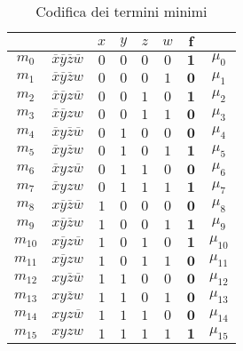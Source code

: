 \documentclass[a4paper]{extarticle}
\begin{document}
\begin{table}[H]
  \centering
  \noindent
  \begin{tabular}{c|c||cccc||c|c}
    $ $ & $ $ & $x$ & $y$ & $z$ & $w$ & $\boldsymbol{f}$\\
    \hline
    $m_0$ & $\overline{x}\overline{y}\overline{z}\overline{w}$ & $0$ & $0$ & $0$ & $0$ & $\boldsymbol{1}$ & $\mu_0$\\
    $m_1$ & $\overline{x}\overline{y}\overline{z}w$ & $0$ & $0$ & $0$ & $1$ & $\boldsymbol{0}$ & $\mu_1$\\
    $m_2$ & $\overline{x}\overline{y}z\overline{w}$ & $0$ & $0$ & $1$ & $0$ & $\boldsymbol{1}$ & $\mu_2$\\
    $m_3$ & $\overline{x}\overline{y}zw$ & $0$ & $0$ & $1$ & $1$ & $\boldsymbol{0}$ & $\mu_3$\\
    $m_4$ & $\overline{x}y\overline{z}\overline{w}$ & $0$ & $1$ & $0$ & $0$ & $\boldsymbol{0}$ & $\mu_4$\\
    $m_5$ & $\overline{x}y\overline{z}w$ & $0$ & $1$ & $0$ & $1$ & $\boldsymbol{1}$ & $\mu_5$\\
    $m_6$ & $\overline{x}yz\overline{w}$ & $0$ & $1$ & $1$ & $0$ & $\boldsymbol{0}$ & $\mu_6$\\
    $m_7$ & $\overline{x}yzw$ & $0$ & $1$ & $1$ & $1$ & $\boldsymbol{1}$ & $\mu_7$\\
    $m_8$ & $x\overline{y}\overline{z}\overline{w}$ & $1$ & $0$ & $0$ & $0$ & $\boldsymbol{0}$ & $\mu_8$\\
    $m_9$ & $x\overline{y}\overline{z}w$ & $1$ & $0$ & $0$ & $1$ & $\boldsymbol{1}$ & $\mu_9$\\
    $m_{10}$ & $x\overline{y}z\overline{w}$ & $1$ & $0$ & $1$ & $0$ & $\boldsymbol{1}$ & $\mu_{10}$\\
    $m_{11}$ & $x\overline{y}zw$ & $1$ & $0$ & $1$ & $1$ & $\boldsymbol{0}$ & $\mu_{11}$\\
    $m_{12}$ & $xy\overline{z}\overline{w}$ & $1$ & $1$ & $0$ & $0$ & $\boldsymbol{0}$ & $\mu_{12}$\\
    $m_{13}$ & $xy\overline{z}w$ & $1$ & $1$ & $0$ & $1$ & $\boldsymbol{0}$ & $\mu_{13}$\\
    $m_{14}$ & $xyz\overline{w}$ & $1$ & $1$ & $1$ & $0$ & $\boldsymbol{0}$ & $\mu_{14}$\\
    $m_{15}$ & $xyzw$ & $1$ & $1$ & $1$ & $1$ & $\boldsymbol{1}$ & $\mu_{15}$\\
  \end{tabular}
  \caption{Codifica dei termini minimi}
  \label{tab:codifica_termini_minimi}
\end{table}
\end{document}
